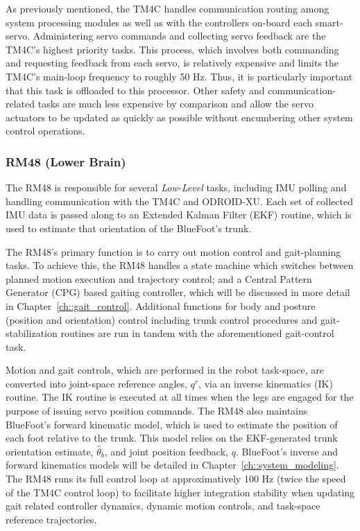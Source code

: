 			As previously mentioned, the TM4C handles communication routing among system processing modules as well as with the controllers on-board each smart-servo. Administering servo commands and collecting servo feedback are the TM4C's highest priority tasks. This process, which involves both commanding and requesting feedback from each servo, is relatively expensive  and limits the TM4C's main-loop frequency to roughly 50 Hz. Thus, it is particularly important that this task is offloaded to this processor. Other safety and communication-related tasks are much less expensive by comparison and allow the servo actuators to be updated as quickly as possible without encumbering other system control operations.


		\subsubsection{RM48 (Lower Brain)}

			The RM48 is responsible for several \emph{Low-Level} tasks, including IMU polling and handling communication with the TM4C and ODROID-XU. Each set of collected IMU data is passed along to an Extended Kalman Filter (EKF) routine, which is used to estimate that orientation of the BlueFoot's trunk.

			The RM48's primary function is to carry out motion control and gait-planning tasks. To achieve this, the RM48 handles a state machine which switches between planned motion execution and trajectory control; and a Central Pattern Generator (CPG) based gaiting controller, which will be discussed in more detail in Chapter~\ref{ch::gait_control}. Additional functions for body and posture (position and orientation) control including trunk control procedures and gait-stabilization routines are run in tandem with the aforementioned gait-control task.

			Motion and gait controls, which are performed in the robot task-space, are converted into joint-space reference angles, $q^{r}$, via an inverse kinematics (IK) routine. The IK routine is executed at all times when the legs are engaged for the purpose of issuing servo position commands. The RM48 also maintains BlueFoot's forward kinematic model, which is used to estimate the position of each foot relative to the trunk. This model relies on the EKF-generated trunk orientation estimate, $\hat{\theta}_{b}$, and joint position feedback, $q$. BlueFoot's inverse and forward kinematics models will be detailed in Chapter~\ref{ch::system_modeling}. The RM48 runs its full control loop at approximatively 100 Hz (twice the speed of the TM4C control loop) to facilitate higher integration stability when updating gait related controller dynamics, dynamic motion controls, and task-space reference trajectories.

